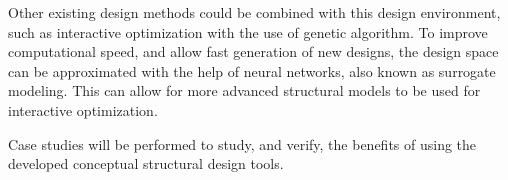 Other existing design methods could be combined with this design environment, such as interactive optimization with the use of genetic algorithm. To improve computational speed, and allow fast generation of new designs, the design space can be approximated with the help of neural networks, also known as surrogate modeling. This can allow for more advanced structural models to be used for interactive optimization.

Case studies will be performed to study, and verify, the benefits of using the developed conceptual structural design tools. 